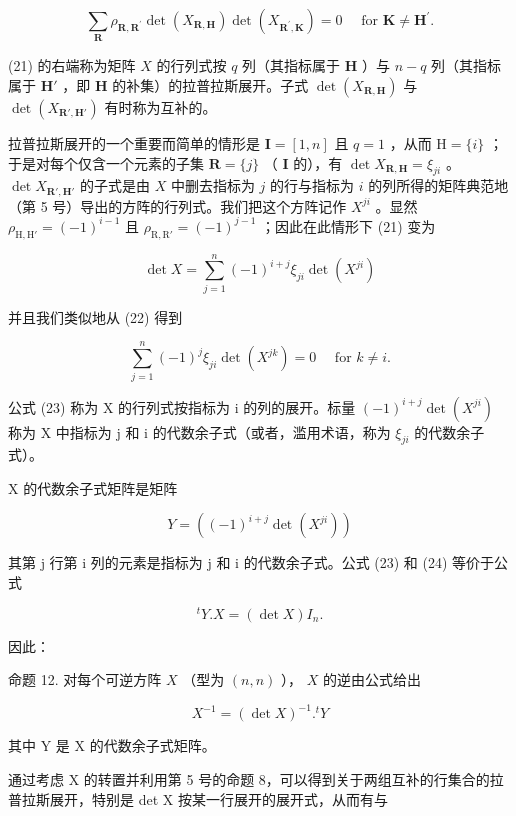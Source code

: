 \[
\sum_ {\mathbf {R}} \rho_ {\mathbf {R}, \mathbf {R} ^ {\prime}} \det (X _ {\mathbf {R}, \mathbf {H}}) \det (X _ {\mathbf {R} ^ {\prime}, \mathbf {K}}) = 0 \quad \text { for } \mathbf {K} \neq \mathbf {H} ^ {\prime}.\tag{22}
\]

(21) 的右端称为矩阵 \(X\) 的行列式按 \(q\) 列（其指标属于 \(\mathbf{H}\) ）与 \(n - q\) 列（其指标属于 \(\mathbf{H}'\) ，即 \(\mathbf{H}\) 的补集）的拉普拉斯展开。子式 \(\det(X_{\mathbf{R},\mathbf{H}})\) 与 \(\det(X_{\mathbf{R}',\mathbf{H}'})\) 有时称为互补的。

拉普拉斯展开的一个重要而简单的情形是 \(\mathbf{I} = [1, n]\) 且 \(q = 1\) ，从而 \(\mathrm{H} = \{i\}\) ；于是对每个仅含一个元素的子集 \(\mathbf{R} = \{j\}\) （ \(\mathbf{I}\) 的），有 \(\det X_{\mathbf{R},\mathbf{H}} = \xi_{ji}\) 。 \(\det X_{\mathbf{R}',\mathbf{H}'}\) 的子式是由 \(X\) 中删去指标为 \(j\) 的行与指标为 \(i\) 的列所得的矩阵典范地（第 5 号）导出的方阵的行列式。我们把这个方阵记作 \(X^{ji}\) 。显然 \(\rho_{\mathrm{H},\mathrm{H}'} = (-1)^{i-1}\) 且 \(\rho_{\mathrm{R},\mathrm{R}'} = (-1)^{j-1}\) ；因此在此情形下 (21) 变为

\[
\det X = \sum_ {j = 1} ^ {n} (- 1) ^ {i + j} \xi_ {j i} \det (X ^ {j i})\tag{23}
\]

并且我们类似地从 (22) 得到

\[
\sum_ {j = 1} ^ {n} (- 1) ^ {j} \xi_ {j i} \det (X ^ {j k}) = 0 \quad \text { for } k \neq i.\tag{24}
\]

公式 (23) 称为 X 的行列式按指标为 i 的列的展开。标量 \((-1)^{i+j}\det(X^{ji})\) 称为 X 中指标为 j 和 i 的代数余子式（或者，滥用术语，称为 \(\xi_{ji}\) 的代数余子式）。

X 的代数余子式矩阵是矩阵

\[
Y = ((- 1) ^ {i + j} \det (X ^ {j i}))\tag{25}
\]

其第 j 行第 i 列的元素是指标为 j 和 i 的代数余子式。公式 (23) 和 (24) 等价于公式

\[
{ } ^ { t } Y . X = ( \operatorname * { d e t } X ) I _ { n } .\tag{26}
\]

因此：

命题 12. 对每个可逆方阵 \(X\) （型为 \((n, n)\) ）， \(X\) 的逆由公式给出

\[
X ^ {- 1} = (\det X) ^ {- 1}. ^ {t} Y\tag{27}
\]

其中 Y 是 X 的代数余子式矩阵。

通过考虑 X 的转置并利用第 5 号的命题 8，可以得到关于两组互补的行集合的拉普拉斯展开，特别是 det X 按某一行展开的展开式，从而有与

